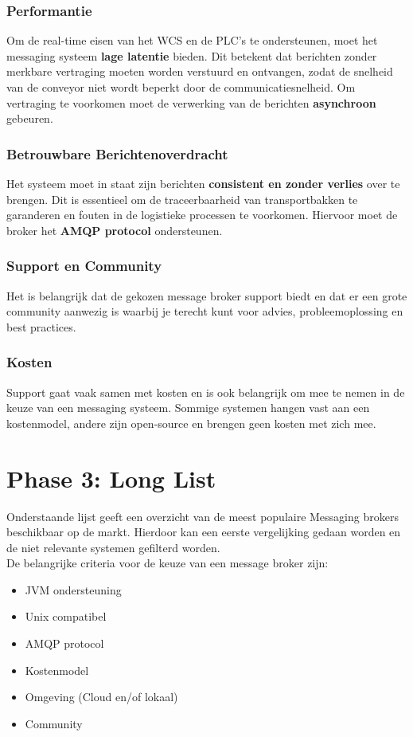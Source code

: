 \subsubsection{Performantie}
Om de real-time eisen van het WCS en de PLC’s te ondersteunen, moet het messaging systeem \textbf{lage latentie} bieden. 
Dit betekent dat berichten zonder merkbare vertraging moeten worden verstuurd en ontvangen, 
zodat de snelheid van de conveyor niet wordt beperkt door de communicatiesnelheid.
Om vertraging te voorkomen moet de verwerking van de berichten \textbf{asynchroon} gebeuren.

\subsubsection{Betrouwbare Berichtenoverdracht}
Het systeem moet in staat zijn berichten \textbf{consistent en zonder verlies} over te brengen. 
Dit is essentieel om de traceerbaarheid van transportbakken te garanderen en fouten in de logistieke processen te voorkomen.
Hiervoor moet de broker het \textbf{AMQP protocol} ondersteunen.

\subsubsection{Support en Community}
Het is belangrijk dat de gekozen message broker support biedt en dat er een grote community aanwezig is 
waarbij je terecht kunt voor advies, probleemoplossing en best practices.

\subsubsection{Kosten}
Support gaat vaak samen met kosten en is ook belangrijk om mee te nemen in de keuze van een messaging systeem.
Sommige systemen hangen vast aan een kostenmodel, andere zijn open-source en brengen geen kosten met zich mee.

\section{Phase 3: Long List}
Onderstaande lijst geeft een overzicht van de meest populaire Messaging brokers beschikbaar op de markt.
Hierdoor kan een eerste vergelijking gedaan worden en de niet relevante systemen gefilterd worden.
\\
De belangrijke criteria voor de keuze van een message broker zijn:
\begin{itemize}
  \item JVM ondersteuning
  \item Unix compatibel 
  \item AMQP protocol
  \item Kostenmodel
  \item Omgeving (Cloud en/of lokaal)
  \item Community
\end{itemize}

